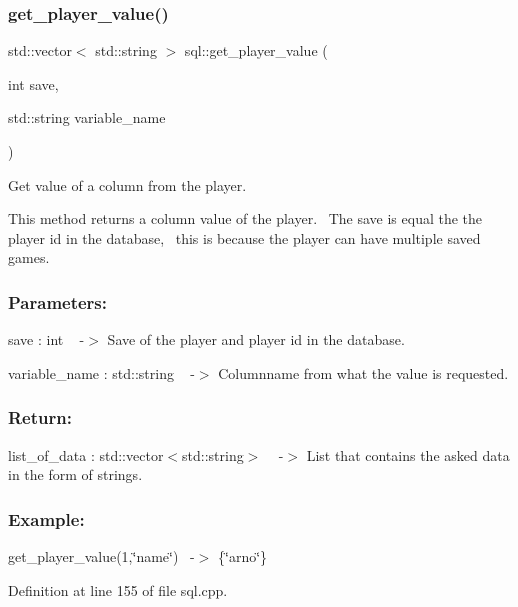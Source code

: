 \subsubsection{\texorpdfstring{get\+\_\+player\+\_\+value()}{get\_player\_value()}\hspace{0.1cm}{\footnotesize\ttfamily [1/2]}}
{\footnotesize\ttfamily std\+::vector$<$ std\+::string $>$ sql\+::get\+\_\+player\+\_\+value (\begin{DoxyParamCaption}\item[{int}]{save,  }\item[{std\+::string}]{variable\+\_\+name }\end{DoxyParamCaption})}



Get value of a column from the player. 

This method returns a column value of the player.~\newline
The save is equal the the player id in the database,~\newline
this is because the player can have multiple saved games.~\newline
 \subsubsection*{Parameters\+: }

save \+: int ~\newline
-\/$>$ Save of the player and player id in the database.

variable\+\_\+name \+: std\+::string ~\newline
-\/$>$ Columnname from what the value is requested.

\subsubsection*{Return\+: }

list\+\_\+of\+\_\+data \+: std\+::vector$<$std\+::string$>$ ~\newline
-\/$>$ List that contains the asked data in the form of strings.

\subsubsection*{Example\+: }

get\+\_\+player\+\_\+value(1,\char`\"{}name\char`\"{})~\newline
-\/$>$ \{\char`\"{}arno\char`\"{}\} 

Definition at line 155 of file sql.\+cpp.

